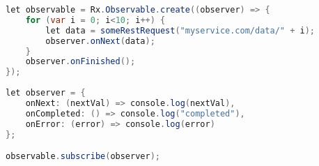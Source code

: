 \begin{lstlisting}[language=java]
let observable = Rx.Observable.create((observer) => {
    for (var i = 0; i<10; i++) {
        let data = someRestRequest("myservice.com/data/" + i);
        observer.onNext(data);
    }
    observer.onFinished();
});
    
let observer = {
    onNext: (nextVal) => console.log(nextVal),
    onCompleted: () => console.log("completed"),
    onError: (error) => console.log(error)
};

observable.subscribe(observer);
\end{lstlisting}
